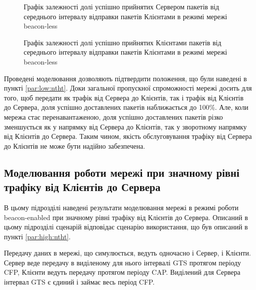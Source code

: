 \documentclass[a4paper,ukrainian,utf8,nocolumnsxix,floatsection,equationsection]{eskdtext}
\newcommand{\longcaption}[1]{\captionsetup{style=figureLongCaption}\caption{#1}}
\newcommand{\blm}[0]{beacon-less\xspace}
\newcommand{\bem}[0]{beacon-enabled\xspace}
\begin{document}
\begin{figure}[htbp]
	\centering
	\longcaption{\label{fig:result_test_backtraf_nobeac_brd_succ_rate}Графік залежності долі успішно прийнятих Сервером пакетів від середнього інтервалу відправки пакетів Клієнтами в режимі мережі \blm}
\end{figure}

\begin{figure}[htbp]
	\centering
	\longcaption{\label{fig:result_test_backtraf_nobeac_brd_deliv}Графік залежності долі успішно прийнятих Клієнтами пакетів від середнього інтервалу відправки пакетів Клієнтами в режимі мережі \blm}
\end{figure}


Проведені моделювання дозволяють підтвердити положення, що були наведені в пункті \ref{par:low:ntht}. Доки загальної пропускної спроможності мережі досить для того, щоб передати як трафік від Сервера до Клієнтів, так і трафік від Клієнтів до Сервера, доля успішно доставлених пакетів наближається до 100\%. Але, коли мережа стає перенавантаженою, доля успішно доставлених пакетів різко зменшується як у напрямку від Сервера до Клієнтів, так у зворотному напрямку від Клієнтів до Сервера. Таким чином, якість обслуговування трафіку від Сервера до Клієнтів не може бути надійно забезпечена.


\subsection{Моделювання роботи мережі при значному рівні трафіку від Клієнтів до Сервера}
\label{par:simulation_backtraf_beac}

В цьому підрозділі наведені результати моделювання мережі в режимі роботи \bem при значному рівні трафіку від Клієнтів до Сервера. Описаний в цьому підрозділі сценарій відповідає сценарію використання, що був описаний в пункті \ref{par:high:ntht}.

Передачу даних в мережі, що симулюється, ведуть одночасно і Сервер, і Клієнти. Сервер веде передачу в виділеному для нього інтервалі GTS протягом періоду CFP, Клієнти ведуть передачу протягом періоду CAP. Виділений для Сервера інтервал GTS є єдиний і займає весь період CFP.
\end{document}
